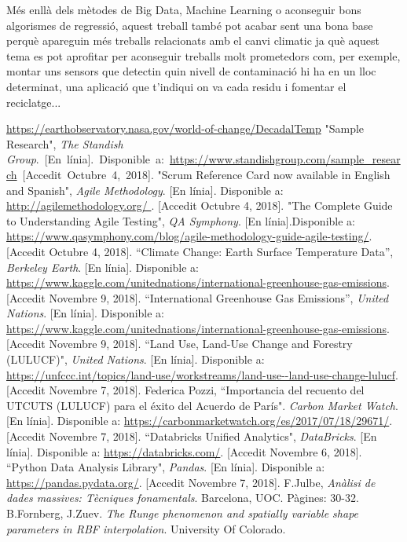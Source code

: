 \documentclass[10pt,a4paper,twocolumn,twoside]{article}
\begin{document}
Més enllà dels mètodes de Big Data, Machine Learning o aconseguir bons algorismes de regressió, aquest treball també pot acabar sent una bona base perquè apareguin més treballs relacionats amb el canvi climatic ja què aquest tema es pot aprofitar per aconseguir treballs molt prometedors com, per exemple, montar uns sensors que detectin quin nivell de contaminació hi ha en un lloc determinat, una aplicació que t'indiqui on va cada residu i fomentar el reciclatge...
\begin{thebibliography}{11}
\url{https://earthobservatory.nasa.gov/world-of-change/DecadalTemp}
"Sample Research", \textit{The Standish Group}.~[En~línia].~Disponible~a:~\url{https://www.standishgroup.com/sample_research}~[Accedit~Octubre~4,~2018].
"Scrum Reference Card now available in English and Spanish",  \textit{Agile Methodology}. [En línia]. Disponible a: \url{http://agilemethodology.org/ }. [Accedit Octubre 4, 2018].
"The Complete Guide to Understanding Agile Testing", \textit{QA Symphony}. [En línia].Disponible a: \url{https://www.qasymphony.com/blog/agile-methodology-guide-agile-testing/}. [Accedit Octubre 4, 2018].
``Climate Change: Earth Surface Temperature Data”, \textit{Berkeley Earth}. [En línia]. Disponible a: \url{ https://www.kaggle.com/unitednations/international-greenhouse-gas-emissions}. [Accedit Novembre 9, 2018].
 ``International Greenhouse Gas Emissions”, \textit{United Nations}. [En línia]. Disponible a: \url{ https://www.kaggle.com/unitednations/international-greenhouse-gas-emissions}. [Accedit Novembre 9, 2018].
 ``Land Use, Land-Use Change and Forestry (LULUCF)", \textit{United Nations}. [En línia]. Disponible a: \url{ https://unfccc.int/topics/land-use/workstreams/land-use--land-use-change-lulucf}. [Accedit Novembre 7, 2018].
Federica Pozzi, ``Importancia del recuento del UTCUTS (LULUCF) para el éxito del Acuerdo de París". \textit{Carbon Market Watch}. [En línia]. Disponible a: \url{https://carbonmarketwatch.org/es/2017/07/18/29671/}. [Accedit Novembre 7, 2018].
``Databricks Unified Analytics", \textit{DataBricks}. [En línia]. Disponible a: \url{https://databricks.com/}. [Accedit Novembre 6, 2018].
 ``Python Data Analysis Library", \textit{Pandas}. [En línia]. Disponible a: \url{https://pandas.pydata.org/}. [Accedit Novembre 7, 2018].
F.Julbe, \textit{Anàlisi de dades massives: Tècniques fonamentals}. Barcelona, UOC. Pàgines: 30-32.
B.Fornberg, J.Zuev. \textit{The Runge phenomenon and spatially variable shape parameters in RBF interpolation}. University Of Colorado.

\end{thebibliography}
\end{document}
